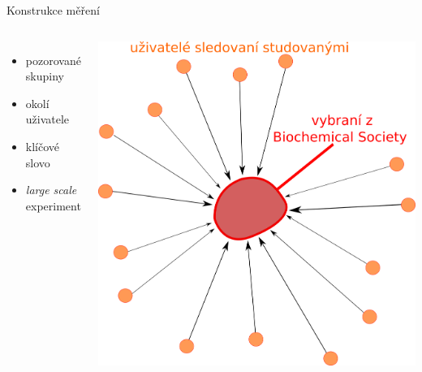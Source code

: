 \documentclass[notheorems,12pt]{beamer}
\begin{document}
\begin{frame}{Konstrukce měření}
    \begin{columns}
    \column{5cm}
    	\begin{itemize}
    		\item pozorované skupiny
    		\item okolí uživatele
    		\item klíčové slovo
    		\item \textit{large scale} experiment
    	\end{itemize}
    \column{6cm}
    	\center
    	\includegraphics[scale=0.4]{./Pics/followers.png}
    \end{columns}
\end{frame}
\end{document}
